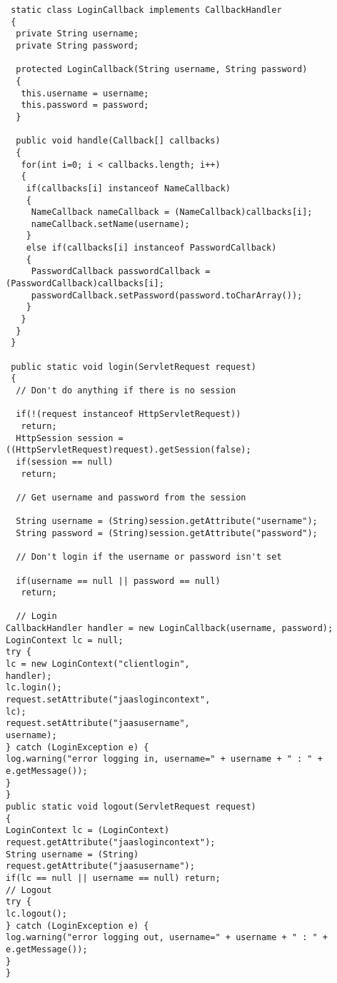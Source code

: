 \begin{enumerate}
\begin{lstlisting}
 static class LoginCallback implements CallbackHandler
 {
  private String username;
  private String password;
  
  protected LoginCallback(String username, String password)
  {
   this.username = username;
   this.password = password;
  }

  public void handle(Callback[] callbacks)
  {
   for(int i=0; i < callbacks.length; i++) 
   {
    if(callbacks[i] instanceof NameCallback)
    {
     NameCallback nameCallback = (NameCallback)callbacks[i];
     nameCallback.setName(username);
    } 
    else if(callbacks[i] instanceof PasswordCallback) 
    {
     PasswordCallback passwordCallback = (PasswordCallback)callbacks[i];
     passwordCallback.setPassword(password.toCharArray());
    }
   }
  }
 }

 public static void login(ServletRequest request)
 {
  // Don't do anything if there is no session
  
  if(!(request instanceof HttpServletRequest)) 
   return;
  HttpSession session = ((HttpServletRequest)request).getSession(false);
  if(session == null)
   return;
 
  // Get username and password from the session

  String username = (String)session.getAttribute("username");
  String password = (String)session.getAttribute("password");

  // Don't login if the username or password isn't set

  if(username == null || password == null)
   return;
  
  // Login
CallbackHandler handler = new LoginCallback(username, password);
LoginContext lc = null;
try {
lc = new LoginContext("clientlogin",
handler);
lc.login();
request.setAttribute("jaaslogincontext",
lc);
request.setAttribute("jaasusername",
username);
} catch (LoginException e) {
log.warning("error logging in, username=" + username + " : " + e.getMessage());
}
}
public static void logout(ServletRequest request)
{
LoginContext lc = (LoginContext)
request.getAttribute("jaaslogincontext");
String username = (String)
request.getAttribute("jaasusername");
if(lc == null || username == null) return;
// Logout
try {
lc.logout();
} catch (LoginException e) {
log.warning("error logging out, username=" + username + " : " + e.getMessage());
}
}
\end{lstlisting}
	\end{enumerate}
